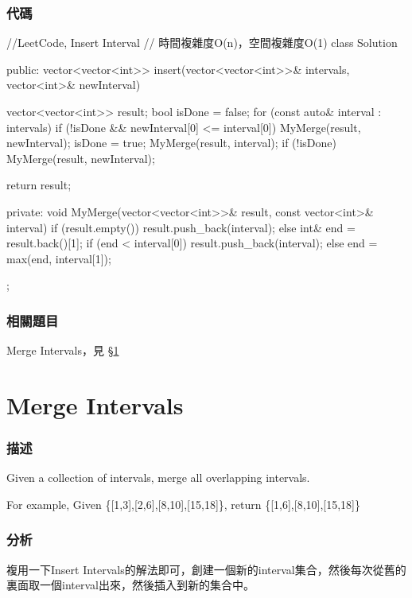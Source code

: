 \subsubsection{代碼}
\begin{Code}
//LeetCode, Insert Interval
// 時間複雜度O(n)，空間複雜度O(1)
class Solution {
public:
    vector<vector<int>> insert(vector<vector<int>>& intervals, vector<int>& newInterval) {
        vector<vector<int>> result;
        bool isDone = false;
        for (const auto& interval : intervals)
        {
            if (!isDone && newInterval[0] <= interval[0])
            {
                MyMerge(result, newInterval);
                isDone = true;
            }
            MyMerge(result, interval);
        }
        if (!isDone)
            MyMerge(result, newInterval);

        return result;
    }
private:
    void MyMerge(vector<vector<int>>& result, const vector<int>& interval)
    {
        if (result.empty())
            result.push_back(interval);
        else
        {
            int& end = result.back()[1];
            if (end < interval[0])
                result.push_back(interval);
            else
                end = max(end, interval[1]);
        }
    }
};
\end{Code}


\subsubsection{相關題目}

\begindot
\item Merge Intervals，見 \S \ref{sec:merge-intervals}
\myenddot


\section{Merge Intervals} %
\label{sec:merge-intervals}


\subsubsection{描述}
Given a collection of intervals, merge all overlapping intervals.

For example,
Given \code\{[1,3],[2,6],[8,10],[15,18]\},
return \code\{[1,6],[8,10],[15,18]\}


\subsubsection{分析}
複用一下Insert Intervals的解法即可，創建一個新的interval集合，然後每次從舊的裏面取一個interval出來，然後插入到新的集合中。


